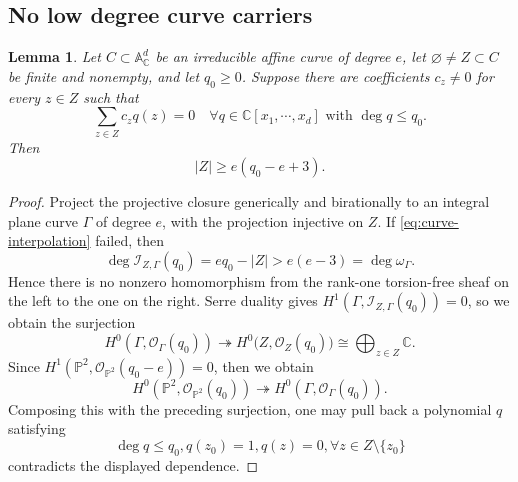 \documentclass[11pt,reqno]{amsart}
\newcommand\C{\ensuremath{\mathbb{C}}}
\newtheorem{lemma}[theorem]{Lemma}
\theoremstyle{definition}
\theoremstyle{plain}
\numberwithin{equation}{section}
\begin{document}
\subsection{No low degree curve carriers}

\begin{lemma}\label{lem:interp}
Let $C\subset\mathbb A^d_{\C}$ be an irreducible affine curve of degree
$e$, let
$\varnothing\ne Z\subset C$ be finite and nonempty, and let $q_0\ge 0$. Suppose there are coefficients
$c_z\ne0$ for every $z\in Z$ such that
\begin{equation*}
 \sum_{z\in Z}c_zq(z)=0
 \quad \forall q\in \C[x_1,\cdots,x_d] \text{ with }\deg q\le q_0.
\end{equation*}
Then
\begin{equation}\label{eq:curve-interpolation}
 |Z|\ge e(q_0-e+3).
\end{equation}
\end{lemma}

\begin{proof}
    Project the projective closure generically and birationally to an integral plane curve $\Gamma$ of degree $e$, with the projection injective on $Z$. If \eqref{eq:curve-interpolation} failed, then
    \begin{equation*}
        \deg \mathcal{I}_{Z,\Gamma}(q_0)=eq_0-|Z|>e(e-3)=\deg \omega_\Gamma.
    \end{equation*}
    Hence there is no nonzero homomorphism from the rank-one torsion-free sheaf on the left to the one on the right. Serre duality \cite[Chapter III, Theorem 7.6]{Hartshorne1977} gives $H^1(\Gamma, \mathcal{I}_{Z,\Gamma}(q_0))=0$, so we obtain the surjection
    \begin{equation*}
        H^0(\Gamma,\mathcal{O}_\Gamma(q_0))\twoheadrightarrow  H^0\bigl(Z,\mathcal{O}_Z(q_0)\bigr)
\cong \bigoplus_{z\in Z}\mathbb{C}.
    \end{equation*}
    Since $H^1(\mathbb{P}^2,\mathcal{O}_{\mathbb{P}^2}(q_0-e))=0$, then we obtain
    \begin{equation*}
        H^0(\mathbb{P}^2,\mathcal{O}_{\mathbb{P}^2}(q_0))\twoheadrightarrow H^0(\Gamma, \mathcal{O}_\Gamma(q_0)).
    \end{equation*}
    Composing this with the preceding surjection, 
    one may pull back a polynomial $q$ satisfying $$\deg q \le q_0, q(z_0)=1,q(z)=0,\forall z\in Z\setminus\lbrace z_0 \rbrace$$ contradicts the displayed dependence.
\end{proof}
\end{document}
